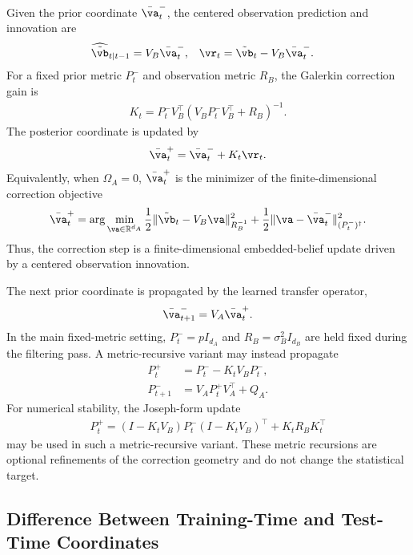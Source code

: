 \documentclass[twoside,11pt]{article}
\begin{document}
Given the prior coordinate $\bar{\va}_t^-$, the centered observation
prediction and innovation are
\begin{align}
\widehat{\tilde{\vb}}_{t|t-1}
&=
V_B\bar{\va}_t^-,
&
\vr_t
&=
\tilde{\vb}_t
-
V_B\bar{\va}_t^-.
\label{eq:test_innovation}
\end{align}
For a fixed prior metric $P_t^-$ and observation metric $R_B$, the
Galerkin correction gain is
\begin{align}
K_t
=
P_t^- V_B^\top
\left(
V_B P_t^- V_B^\top
+
R_B
\right)^{-1}.
\label{eq:test_gain}
\end{align}
The posterior coordinate is updated by
\begin{align}
\bar{\va}_t^+
=
\bar{\va}_t^-
+
K_t\vr_t.
\label{eq:test_posterior_update}
\end{align}
Equivalently, when $\Omega_A=0$, $\bar{\va}_t^+$ is the minimizer of the
finite-dimensional correction objective
\begin{align}
\bar{\va}_t^+
=
\arg\min_{\va\in\mathbb R^{d_A}}
\frac12
\|\tilde{\vb}_t-V_B\va\|_{R_B^{-1}}^2
+
\frac12
\|\va-\bar{\va}_t^-\|_{(P_t^-)^\dagger}^2 .
\label{eq:test_posterior_argmin}
\end{align}
Thus, the correction step is a finite-dimensional embedded-belief update
driven by a centered observation innovation.

The next prior coordinate is propagated by the learned transfer
operator,
\begin{align}
\bar{\va}_{t+1}^-
=
V_A\bar{\va}_t^+.
\label{eq:test_prior_propagation}
\end{align}
In the main fixed-metric setting, $P_t^-=pI_{d_A}$ and
$R_B=\sigma_B^2I_{d_B}$ are held fixed during the filtering pass. A
metric-recursive variant may instead propagate
\begin{align}
P_t^+
&=
P_t^-
-
K_t V_B P_t^-,
\label{eq:test_cov_update_simple}
\\
P_{t+1}^-
&=
V_A P_t^+ V_A^\top
+
Q_A.
\label{eq:test_cov_prediction}
\end{align}
For numerical stability, the Joseph-form update
\begin{align}
P_t^+
=
(I-K_tV_B)P_t^-(I-K_tV_B)^\top
+
K_tR_BK_t^\top
\label{eq:test_cov_update_joseph}
\end{align}
may be used in such a metric-recursive variant. These metric recursions
are optional refinements of the correction geometry and do not change
the statistical target.

\subsection{Difference Between Training-Time and Test-Time Coordinates}
\end{document}
